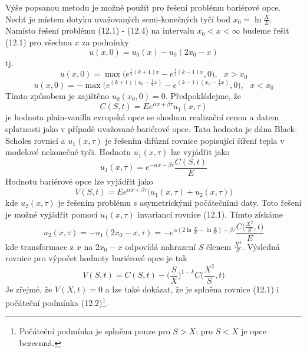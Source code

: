 \documentclass[a4paper]{book}
\begin{document}
Výše popsanou metodu je možné použít pro řešení problému bariérové opce. Nechť je místem dotyku uvažovaných semi-konečných tyčí bod $x_0 = \ln \frac{X}{E}$. Namísto řešení problému (12.1) - (12.4) na intervalu $x_0 < x < \infty$ budeme řešit (12.1) pro všechna $x$ za podmínky
\begin{equation*}
u(x, 0) = u_0(x) - u_0(2x_0 - x)
\end{equation*}
tj.
\begin{equation*}
u(x, 0) = \max \Big( e^{\frac{1}{2}(k+1)x} - e^{\frac{1}{2}(k-1)x}, 0 \Big), ~~~ x > x_0
\end{equation*}
\begin{equation*}
u(x, 0) = - \max \Big( e^{(k+1)(x_0 - \frac{1}{2}x)} - e^{(k-1)(x_0 - \frac{1}{2}x)}, 0 \Big), ~~~ x < x_0
\end{equation*}
Tímto způsobem je zajištěno $u_0(x_0, 0) = 0$. Předpokládejme, že
\begin{equation*}
C(S,t) = Ee^{\alpha x + \beta \tau}u_1(x, \tau)
\end{equation*}
je hodnota plain-vanilla evropská opce se shodnou realizační cenou a datem splatnosti jako v případě uvažované bariérové opce. Tato hodnota je dána Black-Scholes rovnicí a $u_1(x, \tau)$ je řešením difúzní rovnice popisující šíření tepla v modelové nekonečné tyči. Hodnotu $u_1(x, \tau)$ lze vyjádřit jako
\begin{equation*}
u_1(x, \tau) = e^{-\alpha x - \beta  \tau}\frac{C(S,t)}{E}
\end{equation*}
Hodnotu bariérové opce lze vyjádřit jako
\begin{equation*}
V(S,t) = Ee^{\alpha x + \beta \tau} \Big( u_1(x, \tau) + u_2(x, \tau) \Big)
\end{equation*}
kde $u_2(x, \tau)$ je řešením problému s asymetrickými počátečními daty. Toto řešení je možné vyjádřit pomocí $u_1(x, \tau)$ invariancí rovnice (12.1). Tímto získáme
\begin{equation*}
u_2(x, \tau) = -u_1(2x_0 - x, \tau) = -e^{\alpha(2 \ln \frac{X}{E} - \ln \frac{S}{E}) - \beta \tau} \frac{C\Big(\frac{X^2}{S}, t\Big)}{E}
\end{equation*}
kde transformace z $x$ na $2x_0 - x$ odpovídá nahrazení $S$ členem $\frac{X^2}{S}$. Výsledná rovnice pro výpočet hodnoty bariérové opce je tak
\begin{equation*}
V(S,t) = C(S,t) - \Big( \frac{S}{X} \Big)^{1-k}C\Big( \frac{X^2}{S}, t \Big)
\end{equation*}
Je zřejmé, že $V(X,t) = 0$ a lze také dokázat, že je splněna rovnice (12.1) i počáteční podmínka (12.2)\footnote{Počáteční podmínka je splněna pouze pro $S > X$; pro $S < X$ je opce bezcenná.}.
\end{document}
